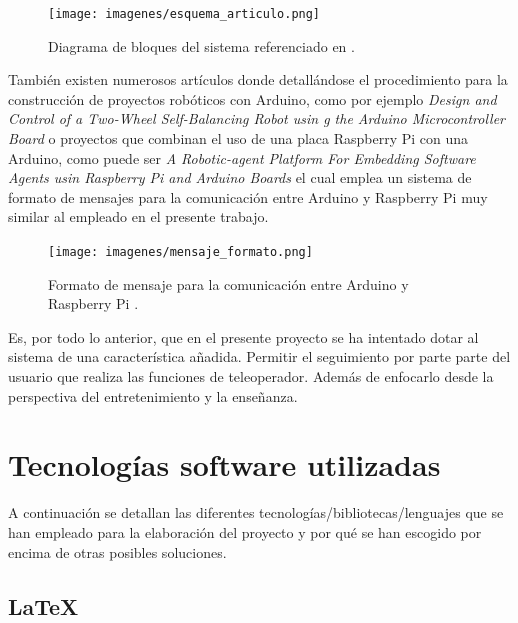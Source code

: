 \begin{figure}[H]
  \begin{center}
    \texttt{[image: imagenes/esquema\_articulo.png]}
  \end{center}
  \label{fig:esquema_articulo}
 \caption{Diagrama de bloques del sistema referenciado en \cite{article:3}.}
\end{figure}
  
  
También existen numerosos artículos donde detallándose el procedimiento para la construcción de proyectos robóticos con Arduino, como por ejemplo \emph{Design and Control of a Two-Wheel Self-Balancing Robot usin
g the Arduino Microcontroller Board} \cite{article-4} o proyectos que combinan el uso de una placa Raspberry Pi con una Arduino, como puede ser \emph{A Robotic-agent Platform For Embedding Software Agents usin Raspberry Pi and Arduino Boards} \cite{article:5} el cual
emplea un sistema de formato de mensajes para la comunicación entre Arduino y Raspberry Pi muy similar al empleado en el presente trabajo.\\
  
\begin{figure}[H]
  \begin{center}
    \texttt{[image: imagenes/mensaje\_formato.png]}
  \end{center}
  \label{fig:mensaje_formato}
 \caption{Formato de mensaje para la comunicación entre Arduino y Raspberry Pi \cite{article:5}.}
\end{figure}
  
Es, por todo lo anterior, que en el presente proyecto se ha intentado dotar al sistema de una característica añadida. Permitir el seguimiento por parte parte del usuario que realiza las funciones de teleoperador. Además de enfocarlo
desde la perspectiva del entretenimiento y la enseñanza.\\


\section{Tecnologías software utilizadas}

A continuación se detallan las diferentes tecnologías/bibliotecas/lenguajes que se han empleado para la elaboración del proyecto y por qué se han escogido por encima de otras posibles soluciones.

\subsection{\LaTeX}

